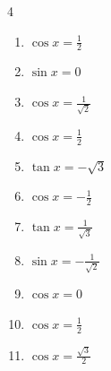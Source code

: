 \begin{multicols}{4}
\begin{enumerate}
  \item $\displaystyle \cos{x}  = \frac{1}{2}$


  \item $\displaystyle \sin{x}  = 0$


  \item $\displaystyle \cos{x}  = \frac{1}{\sqrt{2}}$


  \item $\displaystyle \cos{x}  = \frac{1}{2}$


  \item $\displaystyle \tan{x}  = -\sqrt{3}$


  \item $\displaystyle \cos{x}  = -\frac{1}{2}$


  \item $\displaystyle \tan{x}  = \frac{1}{\sqrt{3}}$


  \item $\displaystyle \sin{x}  = -\frac{1}{\sqrt{2}}$


\columnbreak %

  \item $\displaystyle \cos{x}  = 0$


  \item $\displaystyle \cos{x}  = \frac{1}{2}$


  \item $\displaystyle \cos{x}  = \frac{\sqrt{3}}{2}$



\end{enumerate}
\end{multicols}
